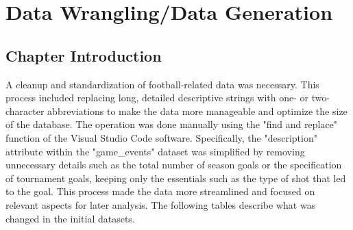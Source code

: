 \documentclass{Configuration_Files/PoliMi3i_thesis}
\begin{document}
\chapter{Data Wrangling/Data Generation}
\label{ch:chapter_two}%

\section{Chapter Introduction}
\label{sec:section_Data_Wrangling/Data_Generation}
A cleanup and standardization of football-related data was necessary. This process included replacing long, detailed descriptive strings with one- or two-character abbreviations to make the data more manageable and optimize the size of the database. The operation was done manually using the "find and replace" function of the Visual Studio Code software. Specifically, the "description" attribute within the "game\_events"  dataset was simplified by removing unnecessary details such as the total number of season goals or the specification of tournament goals, keeping only the essentials such as the type of shot that led to the goal. This process made the data more streamlined and focused on relevant aspects for later analysis. The following tables describe what was changed in the initial datasets.
\newpage
\end{document}
